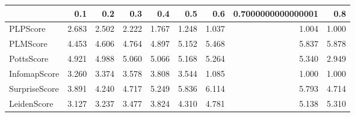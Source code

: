 \begin{tabular}{lrrrrrrrr}
\toprule
{} &   0.1 &   0.2 &   0.3 &   0.4 &   0.5 &   0.6 & 0.7000000000000001 &   0.8 \\
\midrule
PLPScore      & 2.683 & 2.502 & 2.222 & 1.767 & 1.248 & 1.037 &              1.004 & 1.000 \\
PLMScore      & 4.453 & 4.606 & 4.764 & 4.897 & 5.152 & 5.468 &              5.837 & 5.878 \\
PottsScore    & 4.921 & 4.988 & 5.060 & 5.066 & 5.168 & 5.264 &              5.340 & 2.949 \\
InfomapScore  & 3.260 & 3.374 & 3.578 & 3.808 & 3.544 & 1.085 &              1.000 & 1.000 \\
SurpriseScore & 3.891 & 4.240 & 4.717 & 5.249 & 5.836 & 6.114 &              5.793 & 4.714 \\
LeidenScore   & 3.127 & 3.237 & 3.477 & 3.824 & 4.310 & 4.781 &              5.138 & 5.310 \\
\bottomrule
\end{tabular}

